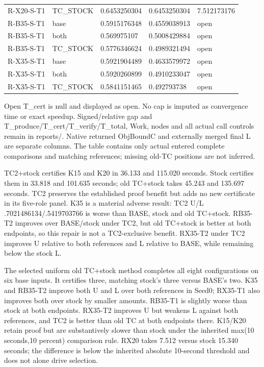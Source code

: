 \documentclass[
  american,
  11pt,
]{article}
\begin{document}
{\begin{longtable}[]{@{}lllll@{}}
R-X20-S-T1 & TC\_\allowbreak{}STOCK & 0.6453250304 & 0.6453250304 & 7.512173176 \\
R-B35-S-T1 & base & 0.5915176348 & 0.4559038913 & open \\
R-B35-S-T1 & both & 0.569975107 & 0.5008429884 & open \\
R-B35-S-T1 & TC\_\allowbreak{}STOCK & 0.5776346624 & 0.4989321494 & open \\
R-X35-S-T1 & base & 0.5921904489 & 0.4633579972 & open \\
R-X35-S-T1 & both & 0.5920260899 & 0.4910233047 & open \\
R-X35-S-T1 & TC\_\allowbreak{}STOCK & 0.5841151465 & 0.492793738 & open \\
\end{longtable}
}

Open T\_\allowbreak{}cert is null and displayed as open. No cap is imputed as
convergence time or exact speedup. Signed/relative gap and
T\_\allowbreak{}produce/T\_\allowbreak{}cert/T\_\allowbreak{}verify/T\_\allowbreak{}total, Work, nodes and all actual call
controls remain in reports/. Native returned ObjBoundC and externally
merged final L are separate columns. The table contains only actual
entered complete comparisons and matching references; missing old-TC
positions are not inferred.

TC2+stock certifies K15 and K20 in 36.133 and 115.020 seconds. Stock
certifies them in 33.818 and 101.635 seconds; old TC+stock takes 45.243
and 135.697 seconds. TC2 preserves the established proof benefit but
adds no new certificate in its five-role panel. K35 is a material
adverse result: TC2 U/L .7021486134/.5419703766 is worse than BASE,
stock and old TC+stock. RB35-T2 improves over BASE/stock under TC2, but
old TC+stock is better at both endpoints, so this repair is not a
TC2-exclusive benefit. RX35-T2 under TC2 improves U relative to both
references and L relative to BASE, while remaining below the stock L.

The selected uniform old TC+stock method completes all eight
configurations on six base inputs. It certifies three, matching stock's
three versus BASE's two. K35 and RB35-T2 improve both U and L over both
references in Seed0; RX35-T1 also improves both over stock by smaller
amounts. RB35-T1 is slightly worse than stock at both endpoints. RX35-T2
improves U but weakens L against both references, and TC2 is better than
old TC at both endpoints there. K15/K20 retain proof but are
substantively slower than stock under the inherited max(10 seconds,10
percent) comparison rule. RX20 takes 7.512 versus stock 15.340 seconds;
the difference is below the inherited absolute 10-second threshold and
does not alone drive selection.
\end{document}
